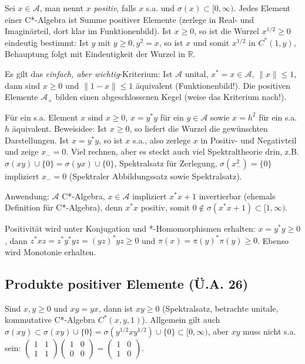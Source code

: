 \documentclass[11pt,a4paper]{scrartcl}
\newcommand{\R}{\mathbb{R}} %
\newcommand{\A}{\mathcal{A}}
\theoremstyle{plain}
\theoremstyle{definition}
\theoremstyle{remark}
\begin{document}
Sei $x\in \A$, man nennt $x$ \emph{positiv}, falls $x$ s.a. und $\sigma(x) \subset [0,\infty)$. Jedes Element einer C*-Algebra ist Summe positiver Elemente (zerlege in Real- und Imaginärteil, dort klar im Funktionenbild). Ist $x \geq 0$, so ist die Wurzel $x^{1/2} \geq 0$ eindeutig bestimmt: Ist $y$ mit $y \geq 0, y^2=x$, so ist $x$ und somit $x^{1/2}$ in $C^*(1,y)$, Behauptung folgt mit Eindeutigkeit der Wurzel in $\R$.

Es gilt das \emph{einfach, aber wichtig}-Kriterium: Ist $\A$ unital, $x^*=x\in \A$, $\|x\| \leq 1$, dann sind $x\geq 0$ und $\|1-x\|\leq 1$ äquivalent (Funktionenbild!). Die positiven Elemente $\A_+$ bilden einen abgeschlossenen Kegel (weise das Kriterium nach!).

Für ein s.a. Element $x$ sind $x\geq 0$, $x=y^*y$ für ein $y\in \A$ sowie $x=h^2$ für ein s.a. $h$ äquivalent. Beweisidee: Ist $x \geq 0$, so liefert die Wurzel die gewünschten Darstellungen. Ist $x=y^*y$, so ist $x$ s.a., also zerlege $x$ in Positiv- und Negativteil und zeige $x_-=0$. Viel rechnen, aber es steckt auch viel Spektraltheorie drin, z.B. $\sigma(xy) \cup \{0\} = \sigma(yx) \cup \{0 \}$, Spektralsatz für Zerlegung, $\sigma(x_-^2)=\{0\}$ impliziert $x_-=0$ (Spektraler Abbildungssatz sowie Spektralsatz).

Anwendung: $\A$ C*-Algebra, $x\in \A$ impliziert $x^*x+1$ invertierbar (ehemals Definition für C*-Algebra), denn $x^*x$ positiv, somit $0\not\in \sigma(x^*x+1) \subset [1,\infty)$.

Positivität wird unter Konjugation und *-Homomorphismen erhalten: $x=y^*y\geq 0$, dann $z^*xz=z^*y^*yz=(yz)^*yz \geq0$ und $\pi(x)=\pi(y)^*\pi(y) \geq 0$. Ebenso wird Monotonie erhalten.

\subsection{Produkte positiver Elemente (Ü.A. 26)}

Sind $x,y \geq 0$ und $xy=yx$, dann ist $xy \geq 0$ (Spektralsatz, betrachte unitale, kommutative C*-Algebra $C^*(x,y,1)$). Allgemein gilt auch $\sigma(xy)\subset \sigma(xy)\cup\{0\}=\sigma(y^{1/2}xy^{1/2})\cup\{0\}\subset [0,\infty)$, aber $xy$ muss nicht s.a. sein: $\left(\begin{smallmatrix} 1 & 1 \\ 1 & 1 \end{smallmatrix}\right)\left(\begin{smallmatrix} 1 & 0 \\ 0 & 0 \end{smallmatrix}\right)=\left(\begin{smallmatrix} 1 & 0 \\ 1 & 0 \end{smallmatrix}\right)$. 
\end{document}
